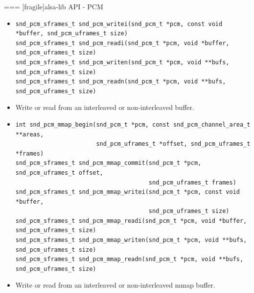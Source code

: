 === [fragile]{alsa-lib API - PCM}
  \begin{itemize}
  \item
    \begin{block}{}
    \fontsize{9}{9}\selectfont
      \begin{verbatim}
snd_pcm_sframes_t snd_pcm_writei(snd_pcm_t *pcm, const void *buffer, snd_pcm_uframes_t size)
snd_pcm_sframes_t snd_pcm_readi(snd_pcm_t *pcm, void *buffer, snd_pcm_uframes_t size)
snd_pcm_sframes_t snd_pcm_writen(snd_pcm_t *pcm, void **bufs, snd_pcm_uframes_t size)
snd_pcm_sframes_t snd_pcm_readn(snd_pcm_t *pcm, void **bufs, snd_pcm_uframes_t size)
      \end{verbatim}
    \end{block}
  \item Write or read from an interleaved or non-interleaved buffer.
  \item
    \begin{block}{}
    \fontsize{9}{9}\selectfont
      \begin{verbatim}
int snd_pcm_mmap_begin(snd_pcm_t *pcm, const snd_pcm_channel_area_t **areas,
                       snd_pcm_uframes_t *offset, snd_pcm_uframes_t *frames)
snd_pcm_sframes_t snd_pcm_mmap_commit(snd_pcm_t *pcm, snd_pcm_uframes_t offset,
                                      snd_pcm_uframes_t frames)
snd_pcm_sframes_t snd_pcm_mmap_writei(snd_pcm_t *pcm, const void *buffer,
                                      snd_pcm_uframes_t size)
snd_pcm_sframes_t snd_pcm_mmap_readi(snd_pcm_t *pcm, void *buffer, snd_pcm_uframes_t size)
snd_pcm_sframes_t snd_pcm_mmap_writen(snd_pcm_t *pcm, void **bufs, snd_pcm_uframes_t size)
snd_pcm_sframes_t snd_pcm_mmap_readn(snd_pcm_t *pcm, void **bufs, snd_pcm_uframes_t size)
      \end{verbatim}
    \end{block}
  \item Write or read from an interleaved or non-interleaved mmap buffer.
  \end{itemize}


